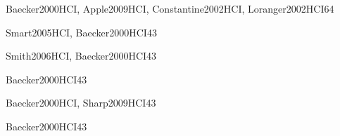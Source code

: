\begin{syllabus}
\begin{unit}{\HCBuildingGUIInterfacesDef}{Baecker2000HCI, Apple2009HCI, Constantine2002HCI, Loranger2002HCI}{6}{4}
    \HCBuildingGUIInterfacesAllTopics
    \HCBuildingGUIInterfacesAllObjectives
\end{unit}

\begin{unit}{\HCGUIProgrammingDef}{Smart2005HCI, Baecker2000HCI}{4}{3}
    \HCGUIProgrammingAllTopics
    \HCGUIProgrammingAllObjectives
\end{unit}

\begin{unit}{\HCMultimediaAndMultimodalSystemsDef}{Smith2006HCI, Baecker2000HCI}{4}{3}
    \HCMultimediaAndMultimodalSystemsAllTopics
    \HCMultimediaAndMultimodalSystemsAllObjectives
\end{unit}

\begin{unit}{\HCCollaborationAndCommunicationDef}{Baecker2000HCI}{4}{3}
    \HCCollaborationAndCommunicationAllTopics
    \HCCollaborationAndCommunicationAllObjectives
\end{unit}

\begin{unit}{\HCInteractionDesignForNewEnvironmentsDef}{Baecker2000HCI, Sharp2009HCI}{4}{3}
    \HCInteractionDesignForNewEnvironmentsAllTopics
    \HCInteractionDesignForNewEnvironmentsAllObjectives
\end{unit}

\begin{unit}{\HCHumanFactorsAndSecurityDef}{Baecker2000HCI}{4}{3}
    \HCHumanFactorsAndSecurityAllTopics
    \HCHumanFactorsAndSecurityAllObjectives
\end{unit}



\begin{coursebibliography}
\end{coursebibliography}
\end{syllabus}
